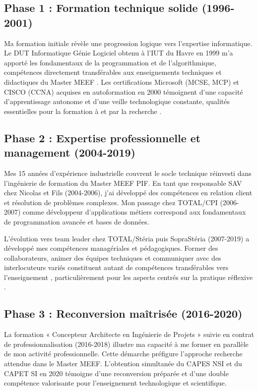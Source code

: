 \subsection{Phase 1 : Formation technique solide (1996-2001)}

Ma formation initiale révèle une progression logique vers l'expertise informatique. Le DUT Informatique Génie Logiciel obtenu à l'IUT du Havre en 1999 m'a apporté les fondamentaux de la programmation et de l'algorithmique, compétences directement transférables aux enseignements techniques et didactiques du Master MEEF \parencite{referentiel_meef}. Les certifications Microsoft (MCSE, MCP) et CISCO (CCNA) acquises en autoformation en 2000 témoignent d'une capacité d'apprentissage autonome et d'une veille technologique constante, qualités essentielles pour la formation à et par la recherche \parencite{referentiel_meef}.

\subsection{Phase 2 : Expertise professionnelle et management (2004-2019)}

Mes 15 années d'expérience industrielle couvrent le socle technique réinvesti dans l'ingénierie de formation du Master MEEF PIF. En tant que responsable SAV chez Nicolas et Fils (2004-2006), j'ai développé des compétences en relation client et résolution de problèmes complexes. Mon passage chez TOTAL/CPI (2006-2007) comme développeur d'applications métiers correspond aux fondamentaux de programmation avancée et bases de données.

L'évolution vers team leader chez TOTAL/Stéria puis SopraStéria (2007-2019) a développé mes compétences managériales et pédagogiques. Former des collaborateurs, animer des équipes techniques et communiquer avec des interlocuteurs variés constituent autant de compétences transférables vers l'enseignement \parencite{knowles_andragogy}, particulièrement pour les aspects centrés sur la pratique réflexive \parencite{schon_reflective_practitioner}.

\subsection{Phase 3 : Reconversion maîtrisée (2016-2020)}

La formation « Concepteur Architecte en Ingénierie de Projets » suivie en contrat de professionnalisation (2016-2018) illustre ma capacité à me former en parallèle de mon activité professionnelle. Cette démarche préfigure l'approche recherche attendue dans le Master MEEF. L'obtention simultanée du CAPES NSI et du CAPET SI en 2020 \parencite{capes_nsi} témoigne d'une reconversion préparée et d'une double compétence valorisante pour l'enseignement technologique et scientifique.

